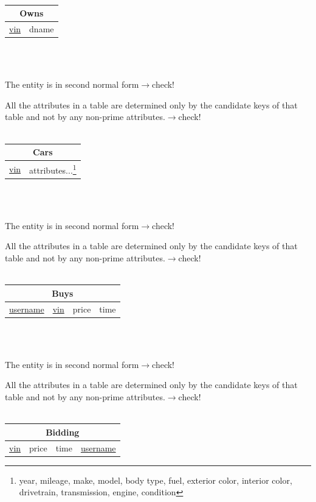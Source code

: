 \documentclass[12pt]{article}
\begin{document}
~\\
\begin{tabularx}{\textwidth}{|X|X|}
\hline
\multicolumn{2}{|c|}{Owns}\\\hline
\underline{vin} & dname\\\hline
\end{tabularx}
~\\~\\
\par The entity is in second normal form\hfill $\rightarrow$check!
\par All the attributes in a table are determined only by the candidate keys of that table and not by any non-prime attributes.\hfill $\rightarrow$check!\\
~\\
\begin{tabularx}{\textwidth}{|X|X|}
\hline
\multicolumn{2}{|c|}{Cars}\\\hline
\underline{vin} & attributes...\footnote{year, mileage, make, model, body type, fuel, exterior color, interior color, drivetrain, transmission, engine, condition}\\\hline
\end{tabularx}
~\\~\\
\par The entity is in second normal form\hfill $\rightarrow$check!
\par All the attributes in a table are determined only by the candidate keys of that table and not by any non-prime attributes.\hfill $\rightarrow$check!\\
~\\
\begin{tabularx}{\textwidth}{|X|X|X|X|}
\hline
\multicolumn{4}{|c|}{Buys}\\\hline
\underline{username} & \underline{vin} & \cellcolor{green!25}price & \cellcolor{green!25}time\\\hline
\end{tabularx}
~\\~\\
\par The entity is in second normal form\hfill $\rightarrow$check!
\par All the attributes in a table are determined only by the candidate keys of that table and not by any non-prime attributes.\hfill $\rightarrow$check!\\
~\\
\begin{tabularx}{\textwidth}{|X|X|X|X|}
\hline
\multicolumn{4}{|c|}{\cellcolor{green!25}Bidding}\\\hline
\cellcolor{green!25}\underline{vin} & \cellcolor{green!25}price & \cellcolor{green!25}time & \cellcolor{green!25}\underline{username}\\\hline
\end{tabularx}
\end{document}
